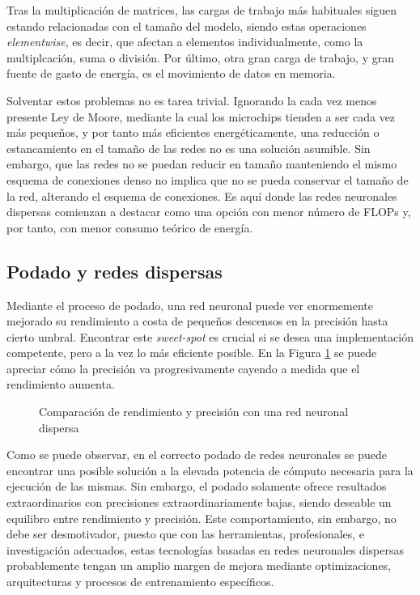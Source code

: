Tras la multiplicación de matrices, las cargas de trabajo más habituales siguen estando relacionadas con el tamaño del modelo, siendo estas operaciones \textit{elementwise}, es decir, que afectan a elementos individualmente, como la multiplcación, suma o división. Por último, otra gran carga de trabajo, y gran fuente de gasto de energía, es el movimiento de datos en memoria.

Solventar estos problemas no es tarea trivial. Ignorando la cada vez menos presente Ley de Moore, mediante la cual los microchips tienden a ser cada vez más pequeños, y por tanto más eficientes energéticamente, una reducción o estancamiento en el tamaño de las redes no es una solución asumible. Sin embargo, que las redes no se puedan reducir en tamaño manteniendo el mismo esquema de conexiones denso no implica que no se pueda conservar el tamaño de la red, alterando el esquema de conexiones. Es aquí donde las redes neuronales dispersas comienzan a destacar como una opción con menor número de FLOPs y, por tanto, con menor consumo teórico de energía.

\subsection{Podado y redes dispersas}
\label{ssec:podado_y_redes_dispersas}
Mediante el proceso de podado, una red neuronal puede ver enormemente mejorado su rendimiento a costa de pequeños descensos en la precisión hasta cierto umbral. Encontrar este \textit{sweet-spot} es crucial si se desea una implementación competente, pero a la vez lo más eficiente posible. En la Figura \ref{fig:grafica_sparse_vs_dense} \cite{neuralmagic_pruning_overview} se puede apreciar cómo la precisión va progresivamente cayendo a medida que el rendimiento aumenta.

\begin{figure}[h!]
    \centering
    \vspace*{0.5cm}
    \def\svgwidth{0.9\textwidth}
    
    \caption{Comparación de rendimiento y precisión con una red neuronal dispersa}
    \label{fig:grafica_sparse_vs_dense}
\end{figure}

Como se puede observar, en el correcto podado de redes neuronales se puede encontrar una posible solución a la elevada potencia de cómputo necesaria para la ejecución de las mismas. Sin embargo, el podado solamente ofrece resultados extraordinarios con precisiones extraordinariamente bajas, siendo deseable un equilibro entre rendimiento y precisión. Este comportamiento, sin embargo, no debe ser desmotivador, puesto que con las herramientas, profesionales, e investigación adecuados, estas tecnologías basadas en redes neuronales dispersas probablemente tengan un amplio margen de mejora mediante optimizaciones, arquitecturas y procesos de entrenamiento específicos.

